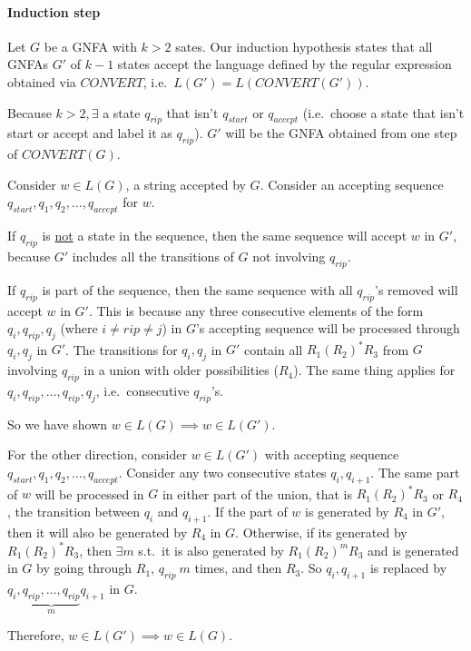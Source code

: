 \documentclass[12 pt]{article}
\begin{document}
\paragraph{Induction step} Let $G$ be a GNFA with $k > 2$ sates. Our
induction hypothesis states that all GNFAs $G'$ of $k-1$ states accept
the language defined by the regular expression obtained via $CONVERT$,
i.e.\ $L(G')=L(CONVERT(G'))$.

Because $k > 2, \exists$ a state $q_{rip}$ that isn't $q_{start}$ or
$q_{accept}$ (i.e.\ choose a state that isn't start or accept and
label it as $q_{rip}$). $G'$ will be the GNFA obtained from one step
of $CONVERT(G)$.

Consider $w\in L(G)$, a string accepted by $G$. Consider an accepting
sequence $q_{start}, q_1, q_2, \ldots, q_{accept}$ for $w$.

If $q_{rip}$ is \underline{not} a state in the sequence, then the same
sequence will accept $w$ in $G'$, because $G'$ includes all the
transitions of $G$ not involving $q_{rip}$.

If $q_{rip}$ is part of the sequence, then the same sequence with all
$q_{rip}$'s removed will accept $w$ in $G'$. This is because any three
consecutive elements of the form $q_i, q_{rip}, q_{j}$ (where $i \neq
rip \neq j$) in $G$'s accepting sequence will be processed through
$q_{i}, q_j$ in $G'$. The transitions for $q_i, q_j$ in $G'$ contain
all $R_1(R_2)^*R_3$ from $G$ involving $q_{rip}$ in a union with older
possibilities ($R_4$). The same thing applies for $q_{i}, q_{rip},
\ldots, q_{rip}, q_{j}$, i.e.\ consecutive $q_{rip}$'s.

So we have shown $w \in L(G) \implies w \in L(G')$.

For the other direction, consider $w \in L(G')$ with accepting
sequence $q_{start},q_{1},q_2, \ldots, q_{accept}$. Consider any two
consecutive states $q_i, q_{i+1}$. The same part of $w$ will be
processed in $G$ in either part of the union, that is $R_1(R_2)^*R_3$
or $R_4$, the transition between $q_i$ and $q_{i+1}$. If the part of
$w$ is generated by $R_4$ in $G'$, then it will also be generated by
$R_4$ in $G$. Otherwise, if its generated by $R_1(R_2)^*R_3$, then
$\exists m$ s.t.\ it is also generated by $R_1(R_2)^mR_3$ and is
generated in $G$ by going through $R_1$, $q_{rip}\ m$ times, and then
$R_3$. So $q_{i}, q_{i+1}$ is replaced by $q_{i}, \underbrace{q_{rip},
  \ldots, q_{rip}}_{m} q_{i+1}$ in $G$.

Therefore, $w \in L(G') \implies w \in L(G)$.
\end{document}
